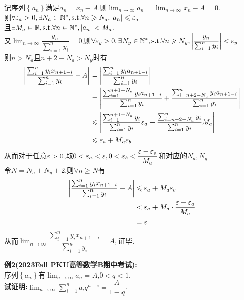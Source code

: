 \documentclass{ctexart}
\begin{document}
\begin{solution}[Proof.]
    记序列$\left\{ a_n\right\}$满足$a_n=x_n-A$.则$\displaystyle\lim_{n\to\infty}{a_n}=\lim_{n\to\infty}{x_n}-A=0$.\\
    则$\forall \varepsilon_a>0,\exists N_a\in\mathbb{N}^*,\text{s.t.}\forall n\geqslant N_a,\left\lvert a_n\right\rvert\leqslant\varepsilon_a$\\
    且$\exists M_a\in\mathbb{R},\text{s.t.}\forall n\in\mathbb{N}^*,\left|a_n\right|<M_a$.\\
    又$\displaystyle\lim_{n\to\infty}\dfrac{y_n}{\sum_{i=1}^{n}{y_i}}=0$,则$\forall\varepsilon_y>0,\exists N_y\in\mathbb{N}^*,\text{s.t.}\forall n\geqslant N_y,\left|\dfrac{y_n}{\sum_{i=1}^{n}{y_i}}\right|<\varepsilon_y$\\
    则$n>N_a$且$n+2-N_a>N_y$时有\begin{align*}
        \left|\dfrac{\sum_{i=1}^{n}{y_ix_{n+1-i}}}{\sum_{i=1}^{n}{y_i}}-A\right|
        &= \left|\dfrac{\sum_{i=1}^{n}{y_ia_{n+1-i}}}{\sum_{i=1}^{n}{y_i}}\right| \\
        &= \left|\dfrac{\sum_{i=1}^{n+1-N_a}{y_ia_{n+1-i}}}{\sum_{i=1}^{n}{y_i}}+\dfrac{\sum_{i=n+2-N_a}^{n}{y_ia_{n+1-i}}}{\sum_{i=1}^{n}{y_i}}\right| \\
        &\leqslant \left|\dfrac{\sum_{i=1}^{n+1-N_a}{y_i}}{\sum_{i=1}^{n}{y_i}}\varepsilon_a+\dfrac{\sum_{i=n+2-N_a}^{n}{y_i}}{\sum_{i=1}^{n}{y_i}}M_a\right| \\
        &\leqslant \varepsilon_a+M_a\varepsilon_b 
    \end{align*}
    从而对于任意$\varepsilon>0$,取$0<\varepsilon_a<\varepsilon,0<\varepsilon_b<\dfrac{\varepsilon-\varepsilon_a}{M_a}$和对应的$N_a,N_y$\\
    令$N=N_a+N_y+2$,则$\forall n\geqslant N$有\begin{align*}
        \left|\dfrac{\sum_{i=1}^{n}{y_ix_{n+1-i}}}{\sum_{i=1}^{n}{y_i}}-A\right|
        &\leqslant \varepsilon_a+M_a\varepsilon_b \\
        &< \varepsilon_a+M_a\cdot\dfrac{\varepsilon-\varepsilon_a}{M_a} \\
        &= \varepsilon
    \end{align*}
    从而$\displaystyle\lim_{n\to\infty}{\dfrac{\sum_{i=1}^{n}{y_ix_{n+1-i}}}{\sum_{i=1}^{n}{y_i}}}=A,$证毕.
\end{solution}
\begin{problem}
    \textbf{例2(2023Fall PKU高等数学B期中考试):} \\
    序列$\left\{ a_n\right\}$有$\displaystyle\lim_{n\to\infty}{a_n}=A$,$0<q<1$.\\
    \textbf{试证明:}$\displaystyle\lim_{n\to\infty}{\sum_{i=1}^{n}{a_iq^{n-i}}}=\dfrac{A}{1-q}$.\\
\end{problem}
\end{document}
